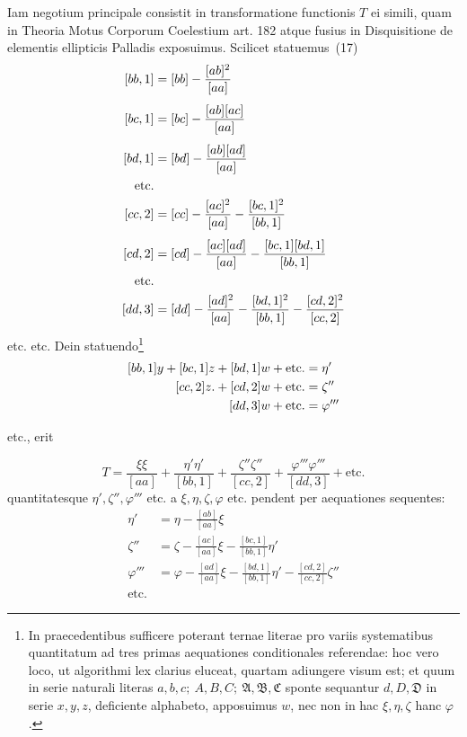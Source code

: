 Iam negotium principale consistit in transformatione functionis \(T\) ei simili, quam in Theoria Motus Corporum Coelestium art. 182 atque fusius in Disquisitione de elementis ellipticis Palladis exposuimus. Scilicet statuemus~(17)
\[
\begin{aligned}\relax
[bb,1]&=[bb]-\frac{[ab]^2}{[aa]}\\[4pt]
[bc,1]&=[bc]-\frac{[ab][ac]}{[aa]}\\[4pt]
[bd,1]&=[bd]-\frac{[ab][ad]}{[aa]}\\
\text{etc.}&\\
[cc,2]&=[cc]-\frac{[ac]^2}{[aa]}-\frac{[bc,1]^2}{[bb,1]}\\[4pt]
[cd,2]&=[cd]-\frac{[ac][ad]}{[aa]}-\frac{[bc,1][bd,1]}{[bb,1]}\\
\text{etc.}&\\
[dd,3]&=[dd]-\frac{[ad]^2}{[aa]}-\frac{[bd,1]^2}{[bb,1]}-\frac{[cd,2]^2}{[cc,2]}
\end{aligned}
\]
etc. etc. Dein statuendo\footnote{In praecedentibus sufficere poterant ternae literae pro variis systematibus quantitatum ad tres primas aequationes conditionales referendae: hoc vero loco, ut algorithmi lex clarius eluceat, quartam adiungere visum est; et quum in serie naturali literas \(a,b,c;\ A,B,C;\ \mathfrak A,\mathfrak B,\mathfrak C\) sponte sequantur \(d,D,\mathfrak D\) in serie \(x,y,z\), deficiente alphabeto, apposuimus \(w\), nec non in hac \(\xi,\eta,\zeta\) hanc \(\varphi\).}
\[
\begin{aligned}\relax
[bb,1]y+[bc,1]z+[bd,1]w+\text{etc.}&=\eta'\\
[cc,2]z.+[cd,2]w+\text{etc.}&=\zeta''\\
[dd,3]w+\text{etc.}&=\varphi'''
\end{aligned}
\]
\begin{center}etc., erit\end{center}
\[
T=\frac{\xi\xi}{[aa]}+\frac{\eta'\eta'}{[bb,1]}+\frac{\zeta''\zeta''}{[cc,2]}+\frac{\varphi'''\varphi'''}{[dd,3]}+\text{etc.}
\]
quantitatesque \(\eta',\zeta'',\varphi'''\) etc. a \(\xi,\eta,\zeta,\varphi\) etc. pendent per aequationes sequentes:
\[
\begin{aligned}
\eta'&=\eta-\frac{[ab]}{[aa]}\xi\\[5pt]
\zeta''&=\zeta-\frac{[ac]}{[aa]}\xi-\frac{[bc,1]}{[bb,1]}\eta'\\[5pt]
\varphi'''&=\varphi-\frac{[ad]}{[aa]}\xi-\frac{[bd,1]}{[bb,1]}\eta'-\frac{[cd,2]}{[cc,2]}\zeta''\\
\text{etc.}&
\end{aligned}
\]

